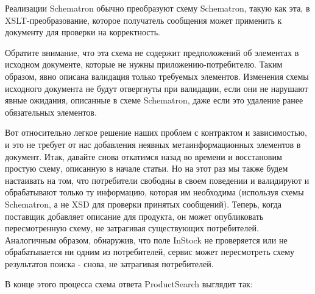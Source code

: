 \documentclass[11pt]{article}
\begin{document}
Реализации Schematron обычно преобразуют схему Schematron, такую как
эта, в XSLT-преобразование, которое получатель сообщения может применить
к документу для проверки на корректность.

Обратите внимание, что эта схема не содержит предположений об элементах
в исходном документе, которые не нужны приложению-потребителю. Таким
образом, явно описана валидация только требуемых элементов. Изменения
схемы исходного документа не будут отвергнуты при валидации, если они не
нарушают явные ожидания, описанные в схеме Schematron, даже если это
удаление ранее обязательных элементов.

Вот относительно легкое решение наших проблем с контрактом и
зависимостью, и это не требует от нас добавления неявных
метаинформационных элементов в документ. Итак, давайте снова откатимся
назад во времени и восстановим простую схему, описанную в начале статьи.
Но на этот раз мы также будем настаивать на том, что потребители
свободны в своем поведении и валидируют и обрабатывают только ту
информацию, которая им необходима (используя схемы Schematron, а не XSD
для проверки принятых сообщений). Теперь, когда поставщик добавляет
описание для продукта, он может опубликовать пересмотренную схему, не
затрагивая существующих потребителей. Аналогичным образом, обнаружив,
что поле InStock не проверяется или не обрабатывается ни одним из
потребителей, сервис может пересмотреть схему результатов поиска -
снова, не затрагивая потребителей.

В конце этого процесса схема ответа ProductSearch выглядит так:
\end{document}
